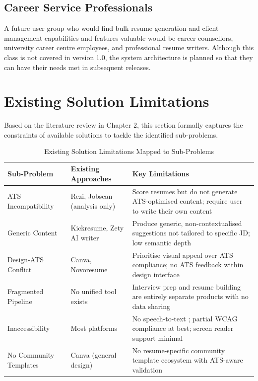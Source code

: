 \documentclass[12pt, a4paper, oneside]{report}
\begin{document}
\subsection{Career Service Professionals}

A future user group who would find bulk resume generation and client management capabilities and features valuable would be career counsellors, university career centre employees, and professional resume writers. Although this class is not covered in version 1.0, the system architecture is planned so that they can have their needs met in subsequent releases.

\section{Existing Solution Limitations}

Based on the literature review in Chapter 2, this section formally captures the constraints of available solutions to tackle the identified sub-problems.

\begin{table}[H]
\centering
\caption{Existing Solution Limitations Mapped to Sub-Problems}
\label{tab:solution_limitations}
\renewcommand{\arraystretch}{1.5}
\begin{tabularx}{\textwidth}{|l|X|X|}
\hline
\textbf{Sub-Problem} & \textbf{Existing Approaches} & \textbf{Key Limitations} \\
\hline
ATS Incompatibility & Rezi, Jobscan \cite{jobscan2021} (analysis only) & Score resumes but do not generate ATS-optimised content; require user to write their own content \\
\hline
Generic Content & Kickresume, Zety AI writer & Produce generic, non-contextualised suggestions not tailored to specific JD; low semantic depth \cite{qin2018} \\
\hline
Design-ATS Conflict & Canva, Novoresume & Prioritise visual appeal over ATS compliance; no ATS feedback within design interface \cite{resumeworded2022} \\
\hline
Fragmented Pipeline & No unified tool exists & Interview prep and resume building are entirely separate products with no data sharing \\
\hline
Inaccessibility & Most platforms & No speech-to-text \cite{sears2003}; partial WCAG compliance \cite{wcag21} at best; screen reader support minimal \\
\hline
No Community Templates & Canva (general design) & No resume-specific community template ecosystem with ATS-aware validation \\
\hline
\end{tabularx}
\end{table}
\end{document}
